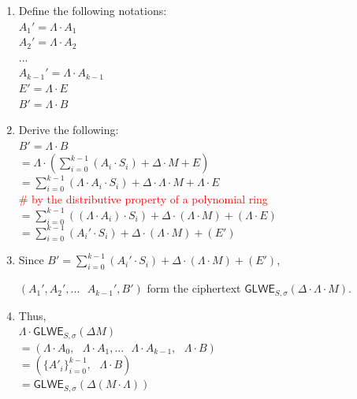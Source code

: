 \begin{myproof}
\begin{enumerate}
\item Define the following notations: \\
$A_1' = \Lambda \cdot A_1$ \\
$A_2' = \Lambda \cdot A_2$ \\
$...$ \\
$A_{k-1}' = \Lambda \cdot A_{k-1}$ \\
$E' = \Lambda \cdot E$ \\
$B' = \Lambda \cdot B$ \\
\item Derive the following: \\
$B' = \Lambda \cdot B$ \\
$= \Lambda \cdot (\sum\limits_{i=0}^{k-1}{(A_i \cdot S_i)} + \Delta \cdot M + E)$ 
$= \sum\limits_{i=0}^{k-1}{(\Lambda \cdot A_i \cdot S_i)} + \Delta \cdot \Lambda \cdot M + \Lambda \cdot E$   \\ \textcolor{red}{ \# by the distributive property of a polynomial ring} \\
$= \sum\limits_{i=0}^{k-1}{((\Lambda \cdot A_i) \cdot S_i)} + \Delta \cdot (\Lambda \cdot M) + (\Lambda \cdot E)$  \\
$= \sum\limits_{i=0}^{k-1}{(A_i' \cdot S_i)} + \Delta \cdot (\Lambda \cdot M) + (E')$ \\
\item Since $B' = \sum\limits_{i=0}^{k-1}{(A_i' \cdot S_i)} + \Delta \cdot (\Lambda \cdot M) + (E')$, 

$(A_1', A_2', ... \text{ } A_{k-1}'
, B')$ form the ciphertext $\textsf{GLWE}_{S, \sigma}(\Delta \cdot \Lambda \cdot M)$.
\item Thus, \\
$\Lambda \cdot \textsf{GLWE}_{S, \sigma}(\Delta M)$ \\
$ = (\Lambda \cdot A_0, \text { } \Lambda \cdot A_1, ... \text{ } \Lambda \cdot A_{k-1}, \text { } \Lambda \cdot B)$ \\
$ = ( \{A'_{i}\}_{i=0}^{k-1}, \text { } \Lambda \cdot B)$ \\
$= \textsf{GLWE}_{S, \sigma}(\Delta (M \cdot \Lambda) )$

\end{enumerate}
\end{myproof}

